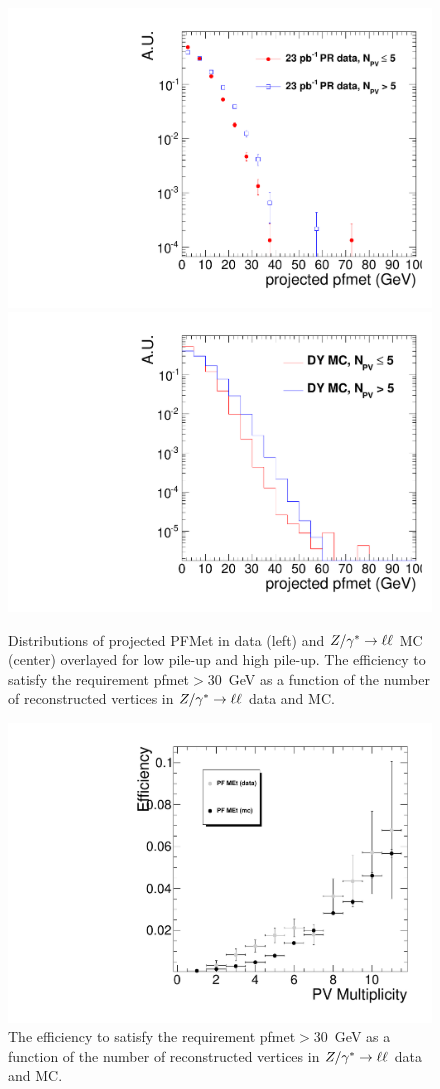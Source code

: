 \begin{figure}[hbt]
\begin{center}
\includegraphics[width=0.4\linewidth]{figures/pfmet_data.pdf} 
\includegraphics[width=0.4\linewidth]{figures/pfmet_dymc.pdf}
\caption{\label{fig:met_pu}\protect Distributions of projected PFMet in data (left) and $Z/\gamma^*\to\ell\ell$ MC (center) 
overlayed for low pile-up and high pile-up. The efficiency to satisfy the requirement pfmet$>30$~GeV as a function
of the number of reconstructed vertices in $Z/\gamma^*\to\ell\ell$ data and MC.}
\end{center}
\begin{center}
\includegraphics[width=0.5\linewidth]{figures/pfmet_Eff30.pdf} 
\caption{\label{fig:meteff_pu}\protect The efficiency to satisfy the requirement pfmet$>30$~GeV as a function
of the number of reconstructed vertices in $Z/\gamma^*\to\ell\ell$ data and MC.}
\end{center}
\end{figure}

